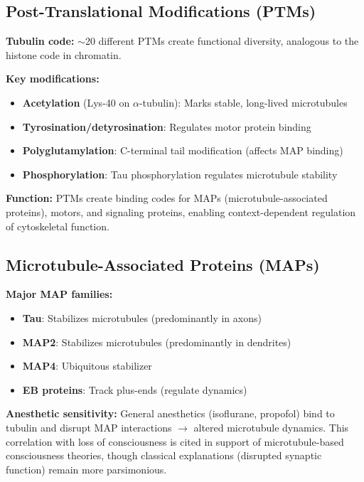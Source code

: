 \subsection{Post-Translational Modifications (PTMs)}

\textbf{Tubulin code:} $\sim$20 different PTMs create functional diversity, analogous to the histone code in chromatin.

\textbf{Key modifications:}
\begin{itemize}
\item \textbf{Acetylation} (Lys-40 on $\alpha$-tubulin): Marks stable, long-lived microtubules
\item \textbf{Tyrosination/detyrosination}: Regulates motor protein binding
\item \textbf{Polyglutamylation}: C-terminal tail modification (affects MAP binding)
\item \textbf{Phosphorylation}: Tau phosphorylation regulates microtubule stability
\end{itemize}

\textbf{Function:} PTMs create binding codes for MAPs (microtubule-associated proteins), motors, and signaling proteins, enabling context-dependent regulation of cytoskeletal function.

\subsection{Microtubule-Associated Proteins (MAPs)}

\textbf{Major MAP families:}
\begin{itemize}
\item \textbf{Tau}: Stabilizes microtubules (predominantly in axons)
\item \textbf{MAP2}: Stabilizes microtubules (predominantly in dendrites)
\item \textbf{MAP4}: Ubiquitous stabilizer
\item \textbf{EB proteins}: Track plus-ends (regulate dynamics)
\end{itemize}

\begin{importantbox}
\textbf{Anesthetic sensitivity:} General anesthetics (isoflurane, propofol) bind to tubulin and disrupt MAP interactions $\rightarrow$ altered microtubule dynamics. This correlation with loss of consciousness is cited in support of microtubule-based consciousness theories, though classical explanations (disrupted synaptic function) remain more parsimonious.
\end{importantbox}

